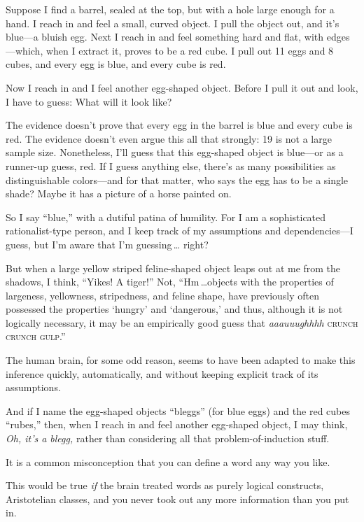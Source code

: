 {{{
 Suppose I find a barrel, sealed at the top, but with a hole large
enough for a hand. I reach in and feel a small, curved object. I pull
the object out, and it's blue---a bluish egg. Next I
reach in and feel something hard and flat, with edges---which, when I
extract it, proves to be a red cube. I pull out 11 eggs and 8 cubes,
and every egg is blue, and every cube is red. }

{
 Now I reach in and I feel another egg-shaped object. Before I pull
it out and look, I have to guess: What will it look like?}

{
 The evidence doesn't prove that every egg in the
barrel is blue and every cube is red. The evidence
doesn't even argue this all that strongly: 19 is not a
large sample size. Nonetheless, I'll guess that this
egg-shaped object is blue---or as a runner-up guess, red. If I guess
anything else, there's as many possibilities as
distinguishable colors---and for that matter, who says the egg has to
be a single shade? Maybe it has a picture of a horse painted on.}

{
 So I say ``blue,'' with a
dutiful patina of humility. For I am a sophisticated rationalist-type
person, and I keep track of my assumptions and dependencies---I guess,
but I'm aware that I'm guessing\,\ldots
right?}

{
 But when a large yellow striped feline-shaped object leaps out at
me from the shadows, I think, ``Yikes! A
tiger!'' Not, ``Hm\,\ldots objects
with the properties of largeness, yellowness, stripedness, and feline
shape, have previously often possessed the properties
`hungry' and
`dangerous,' and thus, although it is
not logically necessary, it may be an empirically good guess that
\textit{aaauuughhhh} \textsc{crunch crunch gulp}.''}

{
 The human brain, for some odd reason, seems to have been adapted
to make this inference quickly, automatically, and without keeping
explicit track of its assumptions.}

{
 And if I name the egg-shaped objects
``bleggs'' (for blue eggs) and the
red cubes ``rubes,'' then, when I
reach in and feel another egg-shaped object, I may think, \textit{Oh,
it's a blegg,} rather than considering all that
problem-of-induction stuff.}

{
 It is a common misconception that you can define a word any way
you like.}

{
 This would be true \textit{if} the brain treated words as purely
logical constructs, Aristotelian classes, and you never took out any
more information than you put in.}

}}
